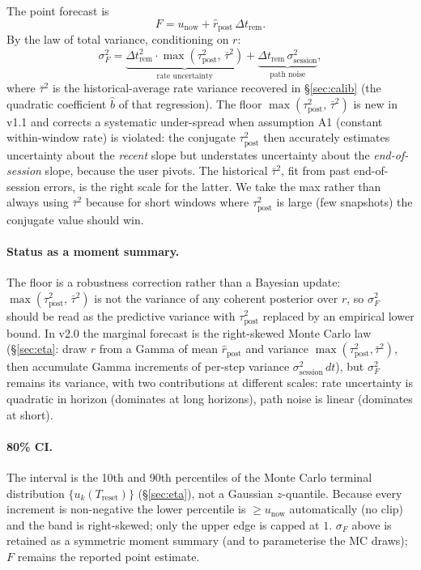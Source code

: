 \documentclass[11pt]{article}
\newcommand{\rpost}{\hat r_{\text{post}}}
\newcommand{\taupostsq}{\tau_{\text{post}}^2}
\newcommand{\sigsessionsq}{\sigma_{\text{session}}^2}
\newcommand{\unow}{u_{\text{now}}}
\newcommand{\Treset}{T_{\text{reset}}}
\newcommand{\Dtrem}{\Delta t_{\text{rem}}}
\begin{document}
The point forecast is
\[
  F = \unow + \rpost\,\Dtrem.
\]
By the law of total variance, conditioning on $r$:
\[
  \sigma_F^2 = \underbrace{\Dtrem^2 \cdot \max(\taupostsq,\, \bar\tau^2)}_{\text{rate uncertainty}}
            + \underbrace{\Dtrem\,\sigsessionsq}_{\text{path noise}},
\]
where $\bar\tau^2$ is the historical-average rate variance recovered in
\S\ref{sec:calib} (the quadratic coefficient $\hat b$ of that regression). The floor
$\max(\taupostsq,\, \bar\tau^2)$ is new in v1.1 and corrects a systematic
under-spread when assumption A1 (constant within-window rate) is violated:
the conjugate $\taupostsq$ then accurately estimates uncertainty about the
\emph{recent} slope but understates uncertainty about the
\emph{end-of-session} slope, because the user pivots. The historical $\bar\tau^2$,
fit from past end-of-session errors, is the right scale for the latter. We
take the max rather than always using $\bar\tau^2$ because for short windows
where $\taupostsq$ is large (few snapshots) the conjugate value should win.

\paragraph{Status as a moment summary.} The floor is a robustness correction
rather than a Bayesian update: $\max(\taupostsq,\, \bar\tau^2)$ is not the
variance of any coherent posterior over $r$, so $\sigma_F^2$ should be read as
the predictive variance with $\taupostsq$ replaced by an empirical lower bound.
In v2.0 the marginal forecast is the right-skewed Monte Carlo law (\S\ref{sec:eta}: draw
$r$ from a Gamma of mean $\rpost$ and variance $\max(\taupostsq,\bar\tau^2)$,
then accumulate Gamma increments of per-step variance $\sigsessionsq\,dt$), but
$\sigma_F^2$ remains its variance, with two contributions at different scales:
rate uncertainty is quadratic in horizon (dominates at long horizons), path
noise is linear (dominates at short).

\paragraph{80\% CI.} The interval is the 10th and 90th percentiles of the Monte
Carlo terminal distribution $\{u_k(\Treset)\}$ (\S\ref{sec:eta}), not a Gaussian
$z$-quantile. Because every increment is non-negative the lower percentile is
$\ge \unow$ automatically (no clip) and the band is right-skewed; only
the upper edge is capped at $1$. $\sigma_F$ above is retained as a symmetric
moment summary (and to parameterise the MC draws); $F$ remains the reported
point estimate.
\end{document}
